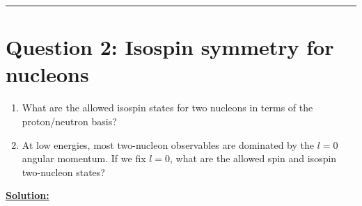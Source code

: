 \documentclass{article}
\begin{document}
\vskip 0.5cm 
\hrule 
\vskip 0.5cm


\section*{Question 2: Isospin symmetry for nucleons} 

\begin{enumerate}[label=(\alph*)]
  \item What are the allowed isospin states for two nucleons in terms of the proton/neutron basis?
  \item At low energies, most two-nucleon observables are dominated by the $l = 0$ angular momentum. If we fix $l = 0$, what are the allowed spin and isospin two-nucleon states?
\end{enumerate}

\vskip 0.5cm
\underline{\textbf{Solution:}} 
\end{document}
